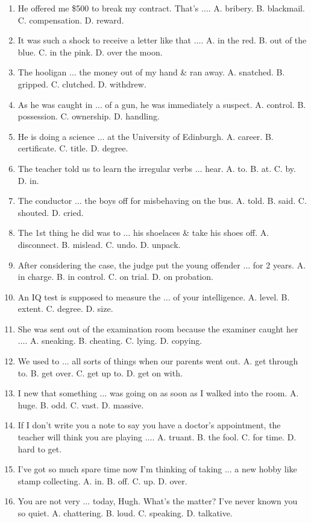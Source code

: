 \documentclass{article}
\numberwithin{equation}{section}
\begin{document}
\begin{enumerate}[leftmargin=2mm]
	\item He offered me \$500 to break my contract. That's $\ldots$. A. bribery. B. blackmail. C. compensation. D. reward.
	\item It was such a shock to receive a letter like that $\ldots$. A. in the red. B. out of the blue. C. in the pink. D. over the moon.
	\item The hooligan $\ldots$ the money out of my hand \& ran away. A. snatched. B. gripped. C. clutched. D. withdrew.
	\item As he was caught in $\ldots$ of a gun, he was immediately a suspect. A. control. B. possession. C. ownership. D. handling.
	\item He is doing a science $\ldots$ at the University of Edinburgh. A. career. B. certificate. C. title. D. degree.
	\item The teacher told us to learn the irregular verbs $\ldots$ hear. A. to. B. at. C. by. D. in.
	\item The conductor $\ldots$ the boys off for misbehaving on the bus. A. told. B. said. C. shouted. D. cried.
	\item The 1st thing he did was to $\ldots$ his shoelaces \& take his shoes off. A. disconnect. B. mislead. C. undo. D. unpack.
	\item After considering the case, the judge put the young offender $\ldots$ for 2 years. A. in charge. B. in control. C. on trial. D. on probation.
	\item An IQ test is supposed to measure the $\ldots$ of your intelligence. A. level. B. extent. C. degree. D. size.
	\item She was sent out of the examination room because the examiner caught her $\ldots$. A. sneaking. B. cheating. C. lying. D. copying.
	\item We used to $\ldots$ all sorts of things when our parents went out. A. get through to. B. get over. C. get up to. D. get on with.
	\item I new that something $\ldots$ was going on as soon as I walked into the room. A. huge. B. odd. C. vast. D. massive.
	\item If I don't write you a note to say you have a doctor's appointment, the teacher will think you are playing $\ldots$. A. truant. B. the fool. C. for time. D. hard to get.
	\item I've got so much spare time now I'm thinking of taking $\ldots$ a new hobby like stamp collecting. A. in. B. off. C. up. D. over.
	\item You are not very $\ldots$ today, Hugh. What's the matter? I've never known you so quiet. A. chattering. B. loud. C. speaking. D. talkative.

\end{enumerate}
\end{document}
